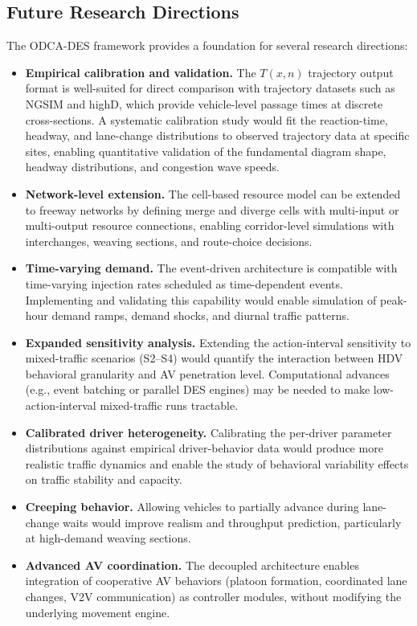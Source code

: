 \documentclass[review,authoryear]{elsarticle}
\begin{document}
\subsection{Future Research Directions}

The ODCA-DES framework provides a foundation for several research directions:

\begin{itemize}
    \item \textbf{Empirical calibration and validation.} The $T(x,n)$ trajectory output format is well-suited for direct comparison with trajectory datasets such as NGSIM and highD, which provide vehicle-level passage times at discrete cross-sections. A systematic calibration study would fit the reaction-time, headway, and lane-change distributions to observed trajectory data at specific sites, enabling quantitative validation of the fundamental diagram shape, headway distributions, and congestion wave speeds.

    \item \textbf{Network-level extension.} The cell-based resource model can be extended to freeway networks by defining merge and diverge cells with multi-input or multi-output resource connections, enabling corridor-level simulations with interchanges, weaving sections, and route-choice decisions.

    \item \textbf{Time-varying demand.} The event-driven architecture is compatible with time-varying injection rates scheduled as time-dependent events. Implementing and validating this capability would enable simulation of peak-hour demand ramps, demand shocks, and diurnal traffic patterns.

    \item \textbf{Expanded sensitivity analysis.} Extending the action-interval sensitivity to mixed-traffic scenarios (S2--S4) would quantify the interaction between HDV behavioral granularity and AV penetration level. Computational advances (e.g., event batching or parallel DES engines) may be needed to make low-action-interval mixed-traffic runs tractable.

    \item \textbf{Calibrated driver heterogeneity.} Calibrating the per-driver parameter distributions against empirical driver-behavior data would produce more realistic traffic dynamics and enable the study of behavioral variability effects on traffic stability and capacity.

    \item \textbf{Creeping behavior.} Allowing vehicles to partially advance during lane-change waits would improve realism and throughput prediction, particularly at high-demand weaving sections.

    \item \textbf{Advanced AV coordination.} The decoupled architecture enables integration of cooperative AV behaviors (platoon formation, coordinated lane changes, V2V communication) as controller modules, without modifying the underlying movement engine.
\end{itemize}




\end{document}
